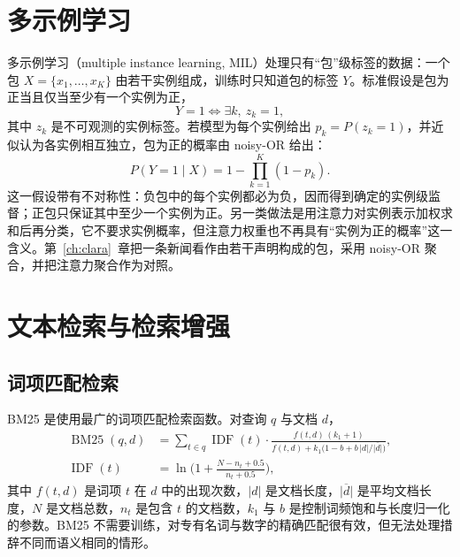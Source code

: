 \section{多示例学习}\label{sec:bg-mil}

多示例学习（multiple instance learning, MIL）\citep{dietterich1997solving,carbonneau2018mil}处理只有“包”级标签的数据：一个包 $X=\{x_1,\dots,x_K\}$ 由若干实例组成，训练时只知道包的标签 $Y$。标准假设是包为正当且仅当至少有一个实例为正，
\begin{equation}
Y=1\iff\exists k,\ z_k=1 ,
\end{equation}
其中 $z_k$ 是不可观测的实例标签。若模型为每个实例给出 $p_k=P(z_k{=}1)$，并近似认为各实例相互独立，包为正的概率由 noisy-OR 给出\citep{maron1998framework}：
\begin{equation}
P(Y{=}1\mid X)=1-\prod_{k=1}^{K}(1-p_k).
\end{equation}
这一假设带有不对称性：负包中的每个实例都必为负，因而得到确定的实例级监督；正包只保证其中至少一个实例为正。另一类做法是用注意力对实例表示加权求和后再分类\citep{ilse2018attention}，它不要求实例概率，但注意力权重也不再具有“实例为正的概率”这一含义。第~\ref{ch:clara}~章把一条新闻看作由若干声明构成的包，采用 noisy-OR 聚合，并把注意力聚合作为对照。

\section{文本检索与检索增强}\label{sec:bg-ir}

\subsection{词项匹配检索}

BM25\citep{robertson2009bm25} 是使用最广的词项匹配检索函数。对查询 $q$ 与文档 $d$，
\begin{equation}
\begin{aligned}
\operatorname{BM25}(q,d)&=\sum_{t\in q}\operatorname{IDF}(t)\cdot\frac{f(t,d)\,(k_1+1)}{f(t,d)+k_1\big(1-b+b\,|d|/\overline{|d|}\big)},\\
\operatorname{IDF}(t)&=\ln\!\Big(1+\frac{N-n_t+0.5}{n_t+0.5}\Big),
\end{aligned}\label{eq:bm25}
\end{equation}
其中 $f(t,d)$ 是词项 $t$ 在 $d$ 中的出现次数，$|d|$ 是文档长度，$\overline{|d|}$ 是平均文档长度，$N$ 是文档总数，$n_t$ 是包含 $t$ 的文档数，$k_1$ 与 $b$ 是控制词频饱和与长度归一化的参数。BM25 不需要训练，对专有名词与数字的精确匹配很有效，但无法处理措辞不同而语义相同的情形。

